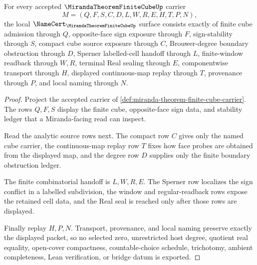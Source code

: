 \begin{theorem}
\label{thm:miranda-theorem-finite-cube-obligations}
For every accepted $\MirandaTheoremFiniteCubeUp$ carrier
$$
M=(Q,F,S,C,D,L,W,R,E,H,T,P,N),
$$
the local $\NameCert_{\MirandaTheoremFiniteCubeUp}$ surface consists exactly of finite cube admission through $Q$, opposite-face sign exposure through $F$, sign-stability through $S$, compact cube source exposure through $C$, Brouwer-degree boundary obstruction through $D$, Sperner labelled-cell handoff through $L$, finite-window readback through $W,R$, terminal Real sealing through $E$, componentwise transport through $H$, displayed continuous-map replay through $T$, provenance through $P$, and local naming through $N$.
\end{theorem}
\begin{proof}
Project the accepted carrier of \autoref{def:miranda-theorem-finite-cube-carrier}. The rows $Q,F,S$ display the finite cube, opposite-face sign data, and stability ledger that a Miranda-facing read can inspect.

Read the analytic source rows next. The compact row $C$ gives only the named cube carrier, the continuous-map replay row $T$ fixes how face probes are obtained from the displayed map, and the degree row $D$ supplies only the finite boundary obstruction ledger.

The finite combinatorial handoff is $L,W,R,E$. The Sperner row localizes the sign conflict in a labelled subdivision, the window and regular-readback rows expose the retained cell data, and the Real seal is reached only after those rows are displayed.

Finally replay $H,P,N$. Transport, provenance, and local naming preserve exactly the displayed packet, so no selected zero, unrestricted host degree, quotient real equality, open-cover compactness, countable-choice schedule, trichotomy, ambient completeness, Lean verification, or bridge datum is exported.
\end{proof}

